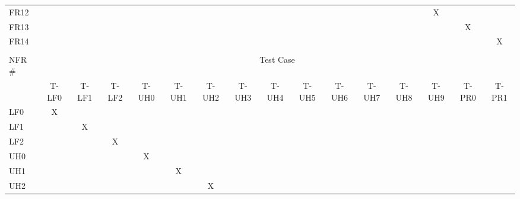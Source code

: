 \documentclass[12pt, titlepage]{article}
\begin{document}
\begin{longtable}{llllllllllllllll}
\multicolumn{1}{l|}{FR12} &  &  &  &  &  &  &  &  &  & \multicolumn{1}{c}{} &  & \multicolumn{1}{c}{} & \multicolumn{1}{c}{X} & \multicolumn{1}{c}{} & \multicolumn{1}{c}{} \\
\multicolumn{1}{l|}{FR13} &  &  &  &  &  &  &  &  &  & \multicolumn{1}{c}{} &  & \multicolumn{1}{c}{} & \multicolumn{1}{c}{} & \multicolumn{1}{c}{X} & \multicolumn{1}{c}{} \\
\multicolumn{1}{l|}{FR14} &  &  &  &  &  &  &  &  &  & \multicolumn{1}{c}{} &  & \multicolumn{1}{c}{} & \multicolumn{1}{c}{} & \multicolumn{1}{c}{} & \multicolumn{1}{c}{X} \\
 &  &  &  &  &  &  &  &  &  &  &  &  &  &  &  \\
\multicolumn{1}{l|}{NFR \#} & \multicolumn{15}{c}{Test Case} \\ \hline
\multicolumn{1}{l|}{} & \multicolumn{1}{c}{T-LF0} & \multicolumn{1}{c}{T-LF1} & \multicolumn{1}{c}{T-LF2} & \multicolumn{1}{c}{T-UH0} & \multicolumn{1}{c}{T-UH1} & \multicolumn{1}{c}{T-UH2} & \multicolumn{1}{c}{T-UH3} & \multicolumn{1}{c}{T-UH4} & \multicolumn{1}{c}{T-UH5} & \multicolumn{1}{c}{T-UH6} & \multicolumn{1}{c}{T-UH7} & \multicolumn{1}{c}{T-UH8} & \multicolumn{1}{c}{T-UH9} & \multicolumn{1}{c}{T-PR0} & \multicolumn{1}{c}{T-PR1} \\
\multicolumn{1}{l|}{LF0} & \multicolumn{1}{c}{X} & \multicolumn{1}{c}{} & \multicolumn{1}{c}{} & \multicolumn{1}{c}{} & \multicolumn{1}{c}{} &  &  &  &  &  &  &  &  &  &  \\
\multicolumn{1}{l|}{LF1} & \multicolumn{1}{c}{} & \multicolumn{1}{c}{X} & \multicolumn{1}{c}{} & \multicolumn{1}{c}{} & \multicolumn{1}{c}{} &  &  &  &  &  &  &  &  &  &  \\
\multicolumn{1}{l|}{LF2} & \multicolumn{1}{c}{} & \multicolumn{1}{c}{} & \multicolumn{1}{c}{X} & \multicolumn{1}{c}{} & \multicolumn{1}{c}{} &  &  &  &  &  &  &  &  &  &  \\
\multicolumn{1}{l|}{UH0} & \multicolumn{1}{c}{} & \multicolumn{1}{c}{} & \multicolumn{1}{c}{} & \multicolumn{1}{c}{X} & \multicolumn{1}{c}{} &  &  &  &  &  &  &  &  &  &  \\
\multicolumn{1}{l|}{UH1} & \multicolumn{1}{c}{} & \multicolumn{1}{c}{} & \multicolumn{1}{c}{} & \multicolumn{1}{c}{} & \multicolumn{1}{c}{X} &  &  &  &  &  &  &  &  &  &  \\
\multicolumn{1}{l|}{UH2} & \multicolumn{1}{c}{} & \multicolumn{1}{c}{} & \multicolumn{1}{c}{} & \multicolumn{1}{c}{} & \multicolumn{1}{c}{} & \multicolumn{1}{c}{X} &  &  &  &  &  &  &  &  &  \\

\end{longtable}
\end{document}
